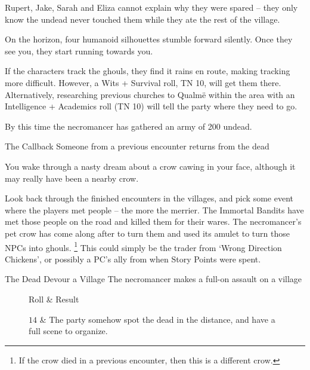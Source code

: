 \begin{multicols}{2}
Rupert, Jake, Sarah and Eliza cannot explain why they were spared -- they only know the undead never touched them while they ate the rest of the village.

\begin{boxtext}

	On the horizon, four humanoid silhouettes stumble forward silently.  Once they see you, they start running towards you.

\end{boxtext}

If the characters track the ghouls, they find it rains en route, making tracking more difficult.
However, a Wits + Survival roll, TN 10, will get them there.
Alternatively, researching previous churches to Qualm\"{e} within the area with an Intelligence + Academics roll (TN 10) will tell the party where they need to go.

By this time the necromancer has gathered an army of 200 undead.

{The Callback}%
{Someone from a previous encounter returns from the dead}%

\begin{boxtext}

	You wake through a nasty dream about a crow cawing in your face, although it may really have been a nearby crow.

\end{boxtext}

Look back through the finished encounters in the villages, and pick some event where the players met people -- the more the merrier.
The Immortal Bandits have met those people on the road and killed them for their wares.
The necromancer's pet crow has come along after to turn them and used its amulet to turn those NPCs into ghouls.
\footnote{If the crow died in a previous encounter, then this is a different crow.}
This could simply be the trader from `Wrong Direction Chickens', or possibly a PC's ally from when Story Points were spent.


{The Dead Devour a Village}%
{The necromancer makes a full-on assault on a village}%

\begin{figure*}[t]
\begin{rollchart}

	Roll & Result \\\hline

	$14$ & The party somehow spot the dead in the distance, and have a full scene to organize. \\


\end{rollchart}
\end{figure*}
\end{multicols}
